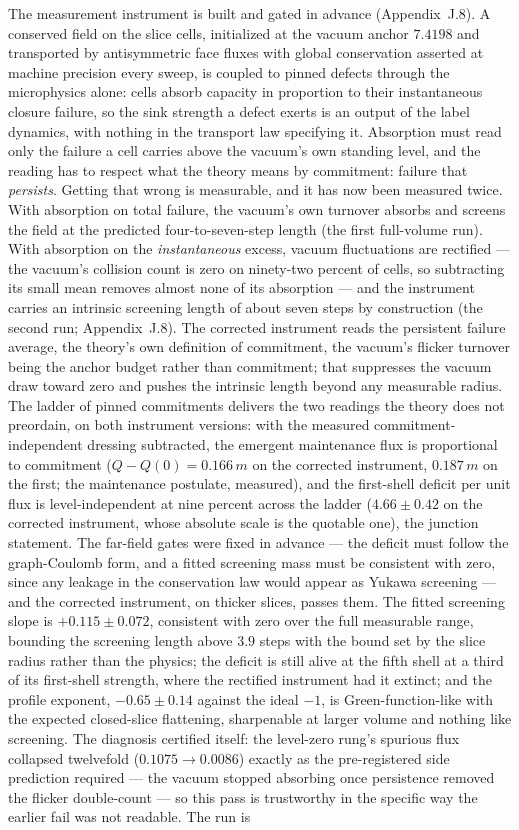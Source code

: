 \documentclass[11pt]{article}
\begin{document}
The measurement instrument is built and gated in advance (Appendix~J.8). A conserved field on the slice cells, initialized at the vacuum anchor $7.4198$ and transported by antisymmetric face fluxes with global conservation asserted at machine precision every sweep, is coupled to pinned defects through the microphysics alone: cells absorb capacity in proportion to their instantaneous closure failure, so the sink strength a defect exerts is an output of the label dynamics, with nothing in the transport law specifying it. Absorption must read only the failure a cell carries above the vacuum's own standing level, and the reading has to respect what the theory means by commitment: failure that \emph{persists}. Getting that wrong is measurable, and it has now been measured twice. With absorption on total failure, the vacuum's own turnover absorbs and screens the field at the predicted four-to-seven-step length (the first full-volume run). With absorption on the \emph{instantaneous} excess, vacuum fluctuations are rectified --- the vacuum's collision count is zero on ninety-two percent of cells, so subtracting its small mean removes almost none of its absorption --- and the instrument carries an intrinsic screening length of about seven steps by construction (the second run; Appendix~J.8). The corrected instrument reads the persistent failure average, the theory's own definition of commitment, the vacuum's flicker turnover being the anchor budget rather than commitment; that suppresses the vacuum draw toward zero and pushes the intrinsic length beyond any measurable radius. The ladder of pinned commitments delivers the two readings the theory does not preordain, on both instrument versions: with the measured commitment-independent dressing subtracted, the emergent maintenance flux is proportional to commitment ($Q-Q(0)=0.166\,m$ on the corrected instrument, $0.187\,m$ on the first; the maintenance postulate, measured), and the first-shell deficit per unit flux is level-independent at nine percent across the ladder ($4.66\pm0.42$ on the corrected instrument, whose absolute scale is the quotable one), the junction statement. The far-field gates were fixed in advance --- the deficit must follow the graph-Coulomb form, and a fitted screening mass must be consistent with zero, since any leakage in the conservation law would appear as Yukawa screening --- and the corrected instrument, on thicker slices, passes them. The fitted screening slope is $+0.115\pm0.072$, consistent with zero over the full measurable range, bounding the screening length above $3.9$ steps with the bound set by the slice radius rather than the physics; the deficit is still alive at the fifth shell at a third of its first-shell strength, where the rectified instrument had it extinct; and the profile exponent, $-0.65\pm0.14$ against the ideal $-1$, is Green-function-like with the expected closed-slice flattening, sharpenable at larger volume and nothing like screening. The diagnosis certified itself: the level-zero rung's spurious flux collapsed twelvefold ($0.1075\to0.0086$) exactly as the pre-registered side prediction required --- the vacuum stopped absorbing once persistence removed the flicker double-count --- so this pass is trustworthy in the specific way the earlier fail was not readable. The run is 
\end{document}
